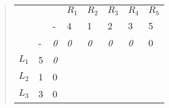 \begin{quote}
    \begin{table}[H]
        \centering
        \begin{tabular}{llllllll}
            \cellcolor[HTML]{FFFFFF}\textit{}      &                        & \cellcolor[HTML]{FFFFFF}\textit{}                       & \cellcolor[HTML]{FFFFFF}\textit{$R_1$}                  & \cellcolor[HTML]{FFFFFF}\textit{$R_2$}                  & \cellcolor[HTML]{FFFFFF}\textit{$R_3$}                  & \cellcolor[HTML]{FFFFFF}\textit{$R_4$}                  & $R_5$                  \\
                                                   &                        & -                                                       & 4                                                       & 1                                                       & 2                                                       & 3                                                       & 5                      \\ \cline{3-8} 
            \cellcolor[HTML]{FFFFFF}\textit{}      & \multicolumn{1}{l|}{-} & \multicolumn{1}{l|}{\cellcolor[HTML]{FFFFFF}\textit{0}} & \multicolumn{1}{l|}{\cellcolor[HTML]{FFFFFF}\textit{0}} & \multicolumn{1}{l|}{\cellcolor[HTML]{FFFFFF}\textit{0}} & \multicolumn{1}{l|}{\cellcolor[HTML]{FFFFFF}\textit{0}} & \multicolumn{1}{l|}{\cellcolor[HTML]{FFFFFF}\textit{0}} & \multicolumn{1}{l|}{0} \\ \cline{3-8} 
            \cellcolor[HTML]{FFFFFF}\textit{$L_1$} & \multicolumn{1}{l|}{5} & \multicolumn{1}{l|}{\cellcolor[HTML]{FFFFFF}\textit{0}} & \multicolumn{1}{l|}{\cellcolor[HTML]{FFFFFF}\textit{}}  & \multicolumn{1}{l|}{\cellcolor[HTML]{FFFFFF}\textit{}}  & \multicolumn{1}{l|}{\cellcolor[HTML]{FFFFFF}\textit{}}  & \multicolumn{1}{l|}{\cellcolor[HTML]{FFFFFF}\textit{}}  & \multicolumn{1}{l|}{}  \\ \cline{3-8} 
            $L_2$                                  & \multicolumn{1}{l|}{1} & \multicolumn{1}{l|}{0}                                  & \multicolumn{1}{l|}{}                                   & \multicolumn{1}{l|}{}                                   & \multicolumn{1}{l|}{}                                   & \multicolumn{1}{l|}{}                                   & \multicolumn{1}{l|}{}  \\ \cline{3-8} 
            $L_3$                                  & \multicolumn{1}{l|}{3} & \multicolumn{1}{l|}{0}                                  & \multicolumn{1}{l|}{}                                   & \multicolumn{1}{l|}{}                                   & \multicolumn{1}{l|}{}                                   & \multicolumn{1}{l|}{}                                   & \multicolumn{1}{l|}{}  \\ \cline{3-8} 

\end{tabular}
\end{table}
\end{quote}
